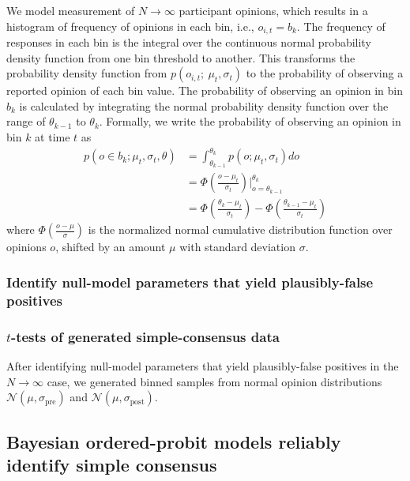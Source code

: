 \documentclass[11pt, letterpaper]{article}
\newcommand{\sigmapre}{\sigma_\mathrm{pre}}
\newcommand{\sigmapost}{\sigma_\mathrm{post}}
\newcommand{\normalpre}{\mathcal{N}(\mu, \sigmapre)}
\newcommand{\normalpost}{\mathcal{N}(\mu, \sigmapost)}
\begin{document}
We model measurement of $N \to \infty$ participant opinions,
which results in a histogram of frequency of opinions
in each bin, i.e., $o_{i,t} = b_k$. The frequency of responses in each bin is 
the integral over the continuous normal probability density function from 
one bin threshold to another. This transforms the probability density 
function from $p(o_{i,t};~\mu_t, \sigma_t)$ to the probability
of observing a reported opinion of each bin value. 
The probability of observing an opinion in bin
$b_k$ is calculated by integrating the normal probability density 
function over the range of $\theta_{k-1}$ to $\theta_{k}$. 
Formally, we write the 
probability of observing an opinion in bin $k$ at time $t$ as
\begin{equation}
\begin{aligned}
  p(o \in b_k; \mu_t, \sigma_t, \theta) 
    &= \int_{\theta_{k-1}}^{\theta_k} p(o;\mu_t, \sigma_t) do \\
    &= \Phi \left( \frac{o - \mu_t}{\sigma_t} \right)\Big|_{o=\theta_{k-1}}^{\theta_k} \\
    &= \Phi \left( \frac{\theta_k - \mu_t}{\sigma_t} \right) - 
       \Phi \left( \frac{\theta_{k-1} - \mu_t}{\sigma_t} \right)
\end{aligned}
\label{eq:binFrequency}
\end{equation}
\noindent
where $\Phi(\frac{o - \mu}{\sigma})$ is the normalized 
normal cumulative distribution function over opinions $o$, shifted by an amount $\mu$ with
standard deviation $\sigma$.
\subsubsection{Identify null-model parameters that yield plausibly-false positives}



\subsubsection{$t$-tests of generated simple-consensus data}

After identifying null-model parameters that yield plausibly-false positives 
in the $N \to \infty$ case, we generated binned samples from normal opinion 
distributions $\normalpre$ and $\normalpost$.

\subsection{Bayesian ordered-probit models reliably identify simple consensus}
\end{document}
